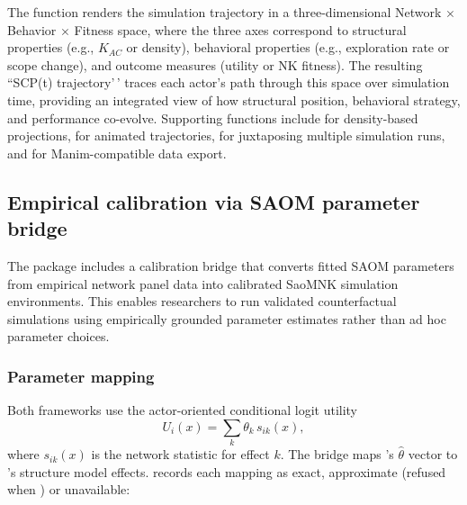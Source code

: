 \documentclass[
  article]{jss}
\begin{document}
The  function renders the
simulation trajectory in a three-dimensional Network \(\times\) Behavior
\(\times\) Fitness space, where the three axes correspond to structural
properties (e.g., \(K_{AC}\) or density), behavioral properties (e.g.,
exploration rate or scope change), and outcome measures (utility or NK
fitness). The resulting ``SCP(t) trajectory'\,' traces each actor's path
through this space over simulation time, providing an integrated view of
how structural position, behavioral strategy, and performance co-evolve.
Supporting functions include  for
density-based projections,  for
animated trajectories,  for
juxtaposing multiple simulation runs, and
 for Manim-compatible data
export.

\subsection{Empirical calibration via SAOM parameter
bridge}\label{sec:calibration}

The  package includes a calibration bridge that converts
fitted SAOM parameters from empirical network panel data into calibrated
SaoMNK simulation environments. This enables researchers to run
validated counterfactual simulations using empirically grounded
parameter estimates rather than ad hoc parameter choices.

\subsubsection{Parameter mapping}\label{parameter-mapping}

Both frameworks use the actor-oriented conditional logit utility
\begin{equation}\label{eq:calibration-utility}
  U_i(x) = \sum_k \theta_k \, s_{ik}(x),
\end{equation} where \(s_{ik}(x)\) is the network statistic for effect
\(k\). The bridge maps 's \(\hat{\theta}\) vector to
's structure model effects. 
records each mapping as exact, approximate (refused when
) or unavailable:
\end{document}
